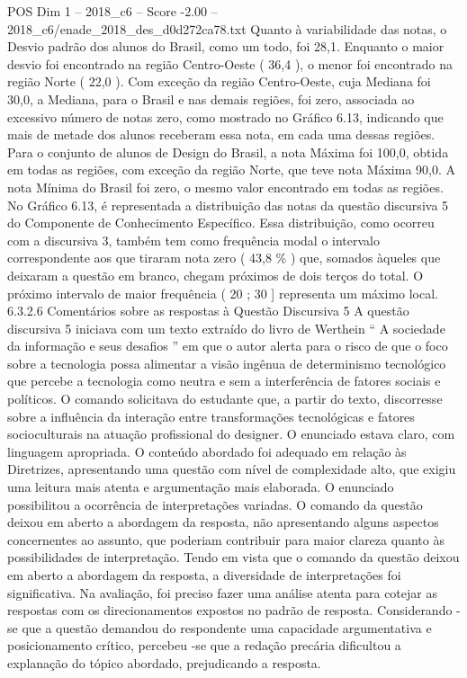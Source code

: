 \begin{textsample}{POS Dim 1 – 2018\_c6 – Score -2.00 – 2018\_c6/enade\_2018\_des\_d0d272ca78.txt}
Quanto à variabilidade das notas, o Desvio padrão dos alunos do Brasil, como um todo, foi 28,1.
Enquanto o maior desvio foi encontrado na região Centro-Oeste ( 36,4 ), o menor foi encontrado na região Norte ( 22,0 ).
Com exceção da região Centro-Oeste, cuja Mediana foi 30,0, a Mediana, para o Brasil e nas demais regiões, foi zero, associada ao excessivo número de notas zero, como mostrado no Gráfico 6.13, indicando que mais de metade dos alunos receberam essa nota, em cada uma dessas regiões.
Para o conjunto de alunos de Design do Brasil, a nota Máxima foi 100,0, obtida em todas as regiões, com exceção da região Norte, que teve nota Máxima 90,0.
A nota Mínima do Brasil foi zero, o mesmo valor encontrado em todas as regiões.
No Gráfico 6.13, é representada a distribuição das notas da questão discursiva 5 do Componente de Conhecimento Específico.
Essa distribuição, como ocorreu com a discursiva 3, também tem como frequência modal o intervalo correspondente aos que tiraram nota zero ( 43,8 \% ) que, somados àqueles que deixaram a questão em branco, chegam próximos de dois terços do total.
O próximo intervalo de maior frequência ( 20 ; 30 ] representa um máximo local. 6.3.2.6 Comentários sobre as respostas à Questão Discursiva 5 A questão discursiva 5 iniciava com um texto extraído do livro de Werthein “ A sociedade da informação e seus desafios ” em que o autor alerta para o risco de que o foco sobre a tecnologia possa alimentar a visão ingênua de determinismo tecnológico que percebe a tecnologia como neutra e sem a interferência de fatores sociais e políticos.
O comando solicitava do estudante que, a partir do texto, discorresse sobre a influência da interação entre transformações tecnológicas e fatores socioculturais na atuação profissional do designer.
O enunciado estava claro, com linguagem apropriada.
O conteúdo abordado foi adequado em relação às Diretrizes, apresentando uma questão com nível de complexidade alto, que exigiu uma leitura mais atenta e argumentação mais elaborada.
O enunciado possibilitou a ocorrência de interpretações variadas.
O comando da questão deixou em aberto a abordagem da resposta, não apresentando alguns aspectos concernentes ao assunto, que poderiam contribuir para maior clareza quanto às possibilidades de interpretação.
Tendo em vista que o comando da questão deixou em aberto a abordagem da resposta, a diversidade de interpretações foi significativa.
Na avaliação, foi preciso fazer uma análise atenta para cotejar as respostas com os direcionamentos expostos no padrão de resposta.
Considerando -se que a questão demandou do respondente uma capacidade argumentativa e posicionamento crítico, percebeu -se que a redação precária dificultou a explanação do tópico abordado, prejudicando a resposta.

\end{textsample}
